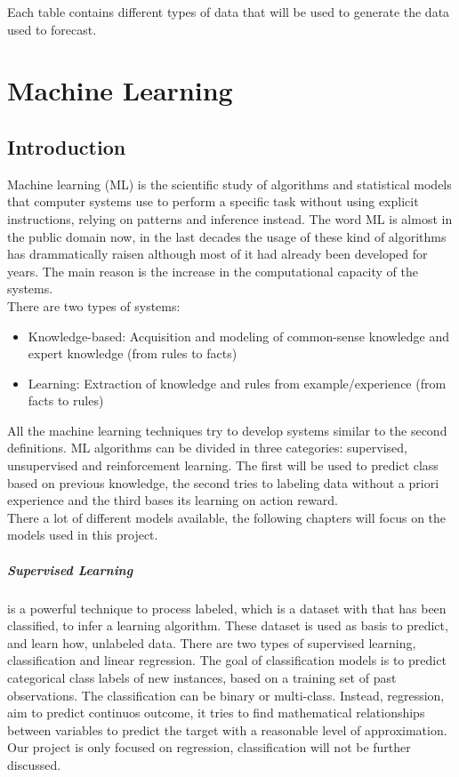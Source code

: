 \documentclass[%
    corpo=12pt,
    twoside,
    oldstyle,
    autoretitolo,
    greek,
    evenboxes,
]{toptesi}
\begin{document}
Each table contains different types of data that will be used to generate the data used to forecast.


\chapter{Machine Learning}
\label{chap:ml}
\section{Introduction}
Machine learning (ML) is the scientific study of algorithms and statistical models that computer systems use to perform a specific task without using explicit instructions, relying on patterns and inference instead. The word ML is almost in the public domain now, in the last decades the usage of these kind of algorithms has drammatically raisen although most of it had already been developed for years. The main reason is the increase in the computational capacity of the systems.\\
There are two types of systems:
\begin{itemize}
  \item Knowledge-based: Acquisition and modeling of common-sense knowledge and expert knowledge (from rules to facts)
  \item Learning: Extraction of knowledge and rules from example/experience (from facts to rules)
\end{itemize}
All the machine learning techniques try to develop systems similar to the second definitions. ML algorithms can be divided in three categories: supervised, unsupervised and reinforcement learning. The first will be used to predict class based on previous knowledge, the second tries to labeling data without a priori experience and the third bases its learning on action reward.\\
There a lot of different models available, the following chapters will focus on the models used in this project.

\paragraph{Supervised Learning}
is a powerful technique to process labeled, which is a dataset with that has been classified, to infer a learning algorithm. These dataset is used as basis to predict, and learn how, unlabeled data. There are two types of supervised learning, classification and linear regression. The goal of classification models is to predict categorical class labels of new instances, based on a training set of past observations. The classification can be binary or multi-class. Instead, regression, aim to predict continuos outcome, it tries to find mathematical relationships between variables to predict the target with a reasonable level of approximation. Our project is only focused on regression, classification will not be further discussed.
\end{document}
